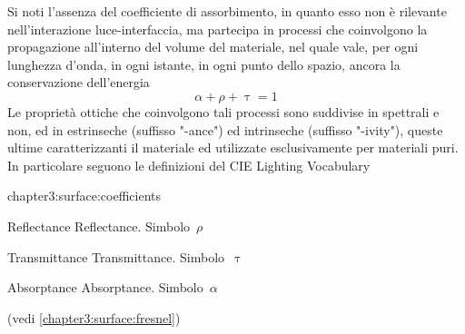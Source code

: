 Si noti l'assenza del coefficiente di assorbimento, in quanto esso non \`e rilevante nell'interazione luce-interfaccia, ma partecipa in processi che 
coinvolgono la propagazione all'interno del volume del materiale, nel quale vale, per ogni lunghezza d'onda, in ogni istante, in ogni punto dello 
spazio, ancora la conservazione dell'energia
\begin{equation}\label{chapter3:surface:bulkEnergyConservation}
	\alpha + \rho + \uptau = 1
\end{equation}
Le propriet\`a ottiche che coinvolgono tali processi sono suddivise in spettrali e non, ed in estrinseche (suffisso "-ance") ed intrinseche 
(suffisso "-ivity"), queste ultime caratterizzanti il materiale ed utilizzate esclusivamente per materiali puri. In particolare seguono le definizioni
del CIE Lighting Vocabulary
\begin{altDescription}{chapter3:surface:coefficients}\label{chapter3:surface:coefficients}
	\item[\Gls{Reflectance}] \Glsdesc{Reflectance}. \mbox{Simbolo $\si{\rho}$}
	\item[\Gls{Transmittance}] \Glsdesc{Transmittance}. \mbox{Simbolo $\si{\uptau}$}
	\item[\Gls{Absorptance}] \Glsdesc{Absorptance}. \mbox{Simbolo $\si{\alpha}$}
\end{altDescription}
(vedi \ref{chapter3:surface:fresnel})
